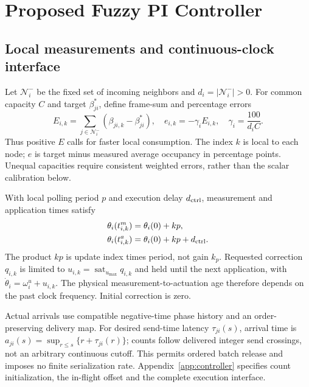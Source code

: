 \section{Proposed Fuzzy PI Controller}
\label{sec:fpi_controller}

\subsection{Local measurements and continuous-clock interface}
\label{subsec:fpi_laws}
Let $\mathcal N_i^-$ be the fixed set of incoming neighbors and
$d_i=|\mathcal N_i^-|>0$. For common capacity $C$ and target
$\beta_{ji}^*$, define frame-sum and percentage errors
\begin{equation}
 E_{i,k}=\sum_{j\in\mathcal N_i^-}(\beta_{ji,k}-\beta_{ji}^*),
 \quad e_{i,k}=-\gamma_iE_{i,k},\quad\gamma_i=\frac{100}{d_iC}.
 \label{eq:fpi_error}
\end{equation}
Thus positive $E$ calls for faster local consumption. The index $k$
is local to each node; $e$ is target minus measured average occupancy
in percentage points. Unequal capacities require consistent weighted
errors, rather than the scalar calibration below.

With local polling period $p$ and execution delay $d_{\rm ctrl}$,
measurement and application times satisfy
\begin{align}
 \theta_i(t^m_{i,k})&=\theta_i(0)+kp,\nonumber\\
 \theta_i(t^a_{i,k})&=\theta_i(0)+kp+d_{\rm ctrl}.
 \label{eq:fpi_local_schedule}
\end{align}
The product $kp$ is update index times period, not gain $k_p$.
Requested correction $q_{i,k}$ is limited to
$u_{i,k}=\operatorname{sat}_{u_{\max}}q_{i,k}$ and held until the
next application, with $\dot\theta_i=\omega_i^u+u_{i,k}$.
The physical measurement-to-actuation age therefore depends on the
past clock frequency. Initial correction is zero.

Actual arrivals use compatible negative-time phase history and an
order-preserving delivery map. For desired send-time latency
$\tau_{ji}(s)$, arrival time is
$a_{ji}(s)=\sup_{r\le s}\{r+\tau_{ji}(r)\}$; counts follow delivered
integer send crossings, not an arbitrary continuous cutoff. This
permits ordered batch release and imposes no finite serialization rate.
Appendix~\ref{app:controller} specifies count initialization, the
in-flight offset and the complete execution interface.

